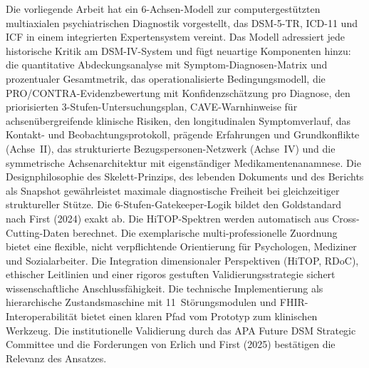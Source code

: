 \documentclass[11pt,a4paper]{article}
\begin{document}
Die vorliegende Arbeit hat ein 6-Achsen-Modell zur computergest\"utzten multiaxialen psychiatrischen Diagnostik vorgestellt, das DSM-5-TR, ICD-11 und ICF in einem integrierten Expertensystem vereint. Das Modell adressiert jede historische Kritik am DSM-IV-System und f\"ugt neuartige Komponenten hinzu: die quantitative Abdeckungsanalyse mit Symptom-Diagnosen-Matrix und prozentualer Gesamtmetrik, das operationalisierte Bedingungsmodell, die PRO/CONTRA-Evidenzbewertung mit Konfidenzsch\"atzung pro Diagnose, den priorisierten 3-Stufen-Untersuchungsplan, CAVE-Warnhinweise f\"ur achsen\"ubergreifende klinische Risiken, den longitudinalen Symptomverlauf, das Kontakt- und Beobachtungsprotokoll, pr\"agende Erfahrungen und Grundkonflikte (Achse~II), das strukturierte Bezugspersonen-Netzwerk (Achse~IV) und die symmetrische Achsenarchitektur mit eigenst\"andiger Medikamentenanamnese. Die Designphilosophie des Skelett-Prinzips, des lebenden Dokuments und des Berichts als Snapshot gew\"ahrleistet maximale diagnostische Freiheit bei gleichzeitiger struktureller St\"utze. Die 6-Stufen-Gatekeeper-Logik bildet den Goldstandard nach First (2024) exakt ab. Die HiTOP-Spektren werden automatisch aus Cross-Cutting-Daten berechnet. Die exemplarische multi-professionelle Zuordnung bietet eine flexible, nicht verpflichtende Orientierung f\"ur Psychologen, Mediziner und Sozialarbeiter. Die Integration dimensionaler Perspektiven (HiTOP, RDoC), ethischer Leitlinien und einer rigoros gestuften Validierungsstrategie sichert wissenschaftliche Anschlussf\"ahigkeit. Die technische Implementierung als hierarchische Zustandsmaschine mit 11~St\"orungsmodulen und FHIR-Interoperabilit\"at bietet einen klaren Pfad vom Prototyp zum klinischen Werkzeug. Die institutionelle Validierung durch das APA Future DSM Strategic Committee und die Forderungen von Erlich und First (2025) best\"atigen die Relevanz des Ansatzes.


\newpage



\end{document}
